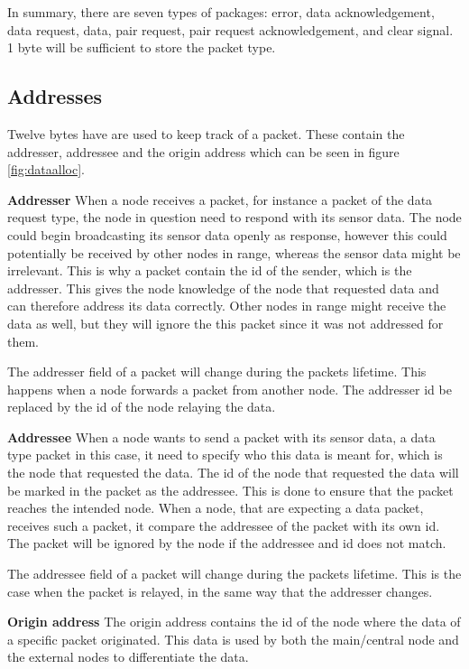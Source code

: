 In summary, there are seven types of packages: error, data acknowledgement, data request, data, pair request, pair request acknowledgement, and clear signal. 1 byte will be sufficient to store the packet type.



\subsection{Addresses}
Twelve bytes have are used to keep track of a packet. These contain the addresser, addressee and the origin address which can be seen in figure \ref{fig:dataalloc}. 

\textbf{Addresser}\newline
When a node receives a packet, for instance a packet of the data request type, the node in question need to respond with its sensor data. The node could begin broadcasting its sensor data openly as response, however this could potentially be received by other nodes in range, whereas the sensor data might be irrelevant. This is why a packet contain the id of the sender, which is the addresser. This gives the node knowledge of the node that requested data and can therefore address its data correctly. Other nodes in range might receive the data as well, but they will ignore the this packet since it was not addressed for them.

The addresser field of a packet will change during the packets lifetime. This happens when a node forwards a packet from another node. The addresser id be replaced by the id of the node relaying the data.

\textbf{Addressee}\newline
When a node wants to send a packet with its sensor data, a data type packet in this case, it need to specify who this data is meant for, which is the node that requested the data. The id of the node that requested the data will be marked in the packet as the addressee. This is done to ensure that the packet reaches the intended node. When a node, that are expecting a data packet, receives such a packet, it compare the addressee of the packet with its own id. The packet will be ignored by the node if the addressee and id does not match.

The addressee field of a packet will change during the packets lifetime. This is the case when the packet is relayed, in the same way that the addresser changes.

\textbf{Origin address}\newline
The origin address contains the id of the node where the data of a specific packet originated. This data is used by both the main/central node and the external nodes to differentiate the data.

